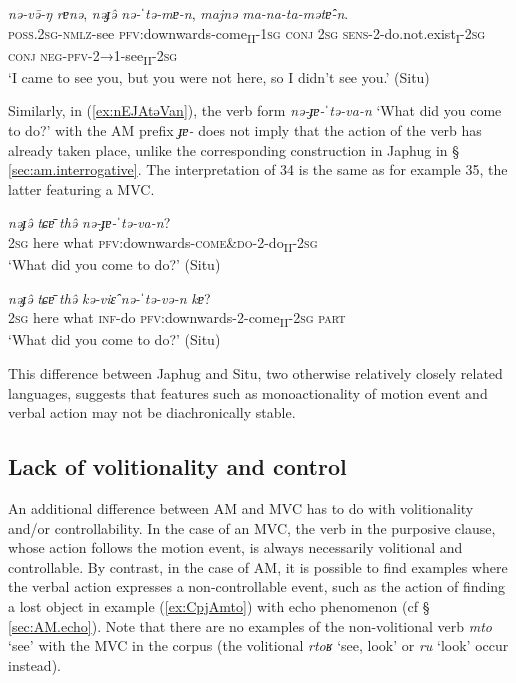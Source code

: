 \documentclass[oneside,a4paper,11pt]{article}
\newcommand{\ipa}[1]{{\phon\textit{#1}}}
\newcommand{\japhug}[2]{\textit{\phon#1} `#2'}
\newcommand{\sens}[1]{‘#1’}
\newcommand{\rouge}[1]{{\color{red}#1}}
\begin{document}
\begin{exe}
\ex  \label{ex:nEkEnatso}
\gll \ipa{nə-kə-natsō} \ipa{nə-və̄-ŋ} \ipa{rɐnə}, \ipa{nəɟə̂} \ipa{nə-ˈtə-mɐ-n}, \ipa{majnə} \ipa{ma-na-ta-mətɐ̂-n}.\\
\textsc{poss.2sg}-\textsc{nmlz}-see \textsc{pfv}:downwards-come\textsubscript{II}-\textsc{1sg} \textsc{conj} \textsc{2sg} \textsc{sens}-2-do.not.exist\textsubscript{I}-\textsc{2sg} \textsc{conj} \textsc{neg}-\textsc{pfv}-2→1-see\textsubscript{II}-\textsc{2sg}\\
\glt  \sens{I came to see you, but you were not here, so I didn't see you.} (Situ)
\end{exe}

Similarly, in (\ref{ex:nEJAtəVan}), the verb form  \ipa{nə-ɟɐ-ˈtə-va-n}  \sens{What did you come to do?} with the AM prefix \ipa{ɟɐ-} does not imply that the action of the verb has already taken place, unlike the corresponding construction in Japhug in § \ref{sec:am.interrogative}.  The interpretation of 34 is the same as for example 35, the latter featuring a MVC.

 

\begin{exe}
\ex \label{ex:nEJAtəVan}
\gll
\ipa{nəɟə̂} \ipa{tɕɐ̄} \ipa{thə̂} \ipa{nə-\rouge{ɟɐ}-ˈtə-va-n}? \\
\textsc{2sg} here what  \textsc{pfv}:downwards-\textsc{\rouge{come\&do}}-2-do\textsubscript{II}-\textsc{2sg} \\
\glt  \sens{What did you come to do?} (Situ)
\end{exe}

\begin{exe}
\ex \label{ex:nEtEvEn}
\gll
\ipa{nəɟə̂} \ipa{tɕɐ̄} \ipa{thə̂} \ipa{kə-viɛ̂} \ipa{nə-ˈtə-və-n} \ipa{kɐ}? \\
\textsc{2sg} here what \textsc{inf}-do \textsc{pfv}:downwards-2-come\textsubscript{II}-\textsc{2sg} \textsc{part} \\
\glt  \sens{What did you come to do?} (Situ)
\end{exe}

This difference between Japhug and Situ, two otherwise relatively closely related languages, suggests that features such as monoactionality of motion event and verbal action may not be diachronically stable.

\subsection{Lack of volitionality and control } \label{sec:volitionality}
An additional difference between AM and MVC has to do with volitionality and/or controllability. In the case of an MVC, the verb in the purposive clause, whose action follows the motion event, is always necessarily volitional and controllable. By contrast, in the case of AM, it is possible to find examples where the verbal action expresses a non-controllable event, such as the action of finding a lost object in example (\ref{ex:CpjAmto}) with echo phenomenon (cf § \ref{sec:AM.echo}). Note that there are no examples of the non-volitional verb \japhug{mto}{see} with the MVC in the corpus (the volitional \japhug{rtoʁ}{see, look} or \japhug{ru}{look} occur  instead). 
\end{document}
